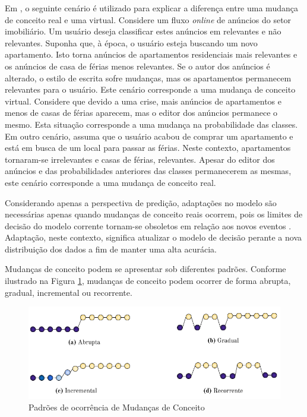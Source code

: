 \documentclass[qual, classic, a4paper]{ufbathesis}
\begin{document}
Em \cite{Gama:2014:SCD:2597757.2523813}, o seguinte cenário é utilizado para explicar a diferença entre uma mudança de conceito real e uma virtual.
Considere um fluxo \textit{online} de anúncios do setor imobiliário.
Um usuário deseja classificar estes anúncios em relevantes e não relevantes.
Suponha que, à época, o usuário esteja buscando um novo apartamento. 
Isto torna anúncios de apartamentos residenciais mais relevantes e os anúncios de casa de férias menos relevantes.
Se o autor dos anúncios é alterado, o estilo de escrita sofre mudanças, mas os apartamentos permanecem relevantes para o usuário.
Este cenário corresponde a uma mudança de conceito virtual.
Considere que devido a uma crise, mais anúncios de apartamentos e menos de casas de férias aparecem, mas o editor dos anúncios permanece o mesmo.
Esta situação corresponde a uma mudança na probabilidade das classes.
Em outro cenário, assuma que o usuário acabou de comprar um apartamento e está em busca de um local para passar as férias.
Neste contexto, apartamentos tornaram-se irrelevantes e casas de férias, relevantes.
Apesar do editor dos anúncios e das probabilidades anteriores das classes permanecerem as mesmas, este cenário corresponde a uma mudança de conceito real.

Considerando apenas a perspectiva de predição, adaptações no modelo são necessárias apenas quando mudanças de conceito reais ocorrem, 
pois os limites de decisão do modelo corrente tornam-se obsoletos em relação aos novos eventos \cite{Gama:2014:SCD:2597757.2523813}.
Adaptação, neste contexto, significa atualizar o modelo de decisão perante a nova distribuição dos dados a fim de manter uma alta acurácia.

Mudanças de conceito podem se apresentar sob diferentes padrões.
Conforme ilustrado na Figura \ref{fig:concept_drift_patterns}, mudanças de conceito podem ocorrer de forma abrupta, gradual, incremental ou recorrente.
 
\begin{figure}[!ht]
\begin{center}
    \includegraphics[scale=0.80]{imagens/concept_drift_patterns.png}
    \caption{Padrões de ocorrência de Mudanças de Conceito}
    \label{fig:concept_drift_patterns}
\end{center}
\end{figure}
\end{document}
